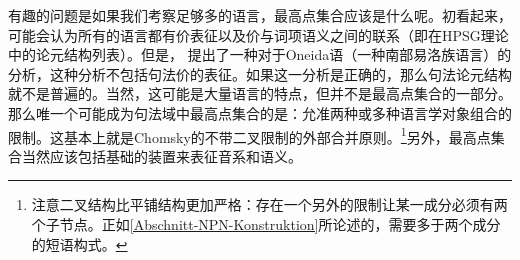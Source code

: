 有趣的问题是如果我们考察足够多的语言，最高点集合应该是什么呢。初看起来，可能会认为所有的语言都有价表征以及价与词项语义之间的联系（即在HPSG理论中的论元结构列表）。但是， \citet{KM2012a}提出了一种对于Oneida语（一种南部易洛族语言）的分析，这种分析不包括句法价的表征。如果这一分析是正确的，那么句法论元结构就不是普遍的。当然，这可能是大量语言的特点，但并不是最高点集合的一部分。那么唯一个可能成为句法域中最高点集合的是：允准两种或多种语言学对象组合的限制。这基本上就是Chomsky的不带二叉限制的外部合并原则。\footnote{%
注意二叉结构比平铺结构更加严格：存在一个另外的限制让某一成分必须有两个子节点。正如\ref{Abschnitt-NPN-Konstruktion}所论述的，需要多于两个成分的短语构式。  
}另外，最高点集合当然应该包括基础的装置来表征音系和语义。

